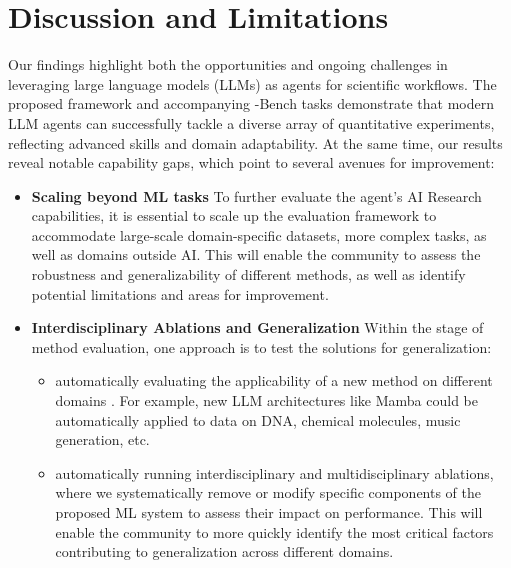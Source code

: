 \section{Discussion and Limitations}
\label{sec:discussion}
Our findings highlight both the opportunities and ongoing challenges in leveraging large language models (LLMs) as agents for scientific workflows. The proposed \mlgym framework and accompanying \mlgym-Bench tasks demonstrate that modern LLM agents can successfully tackle a diverse array of quantitative experiments, reflecting advanced skills and domain adaptability. At the same time, our results reveal notable capability gaps, which point to several avenues for improvement:

\begin{itemize}
\item \textbf{Scaling beyond ML tasks}
To further evaluate the agent's AI Research capabilities, it is essential to scale up the evaluation framework to accommodate large-scale domain-specific datasets, more complex tasks, as well as domains outside AI. This will enable the community to assess the robustness and generalizability of different methods, as well as identify potential limitations and areas for improvement.

\item \textbf{Interdisciplinary Ablations and Generalization}
Within the stage of method evaluation, one approach is to test the solutions for generalization: 
\begin{itemize}
    \item automatically evaluating the applicability of a new method on different domains .
    For example, new LLM architectures like Mamba \citep{gu2024mambalineartimesequencemodeling} could be automatically applied to data on DNA, chemical molecules, music generation, etc.
    \item automatically running interdisciplinary and multidisciplinary ablations, where we systematically remove or modify specific components of the proposed ML system to assess their impact on performance. This will enable the community to more quickly identify the most critical factors contributing to generalization across different domains.
\end{itemize}



\end{itemize}
